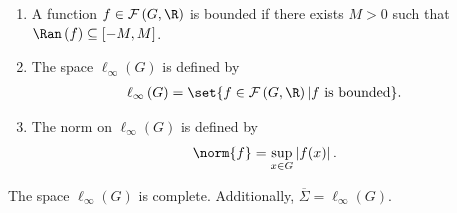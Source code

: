 \begin{definition}\hfill
  \begin{enumerate}[(1)]
    \item A function $f\in \mathcal{F}\left(G,\R\right)$ is bounded if there exists $M > 0$ such that $\Ran\left(f\right) \subseteq \left[-M,M\right]$.
    \item The space $\ell_{\infty}\left(G\right)$ is defined by
      \begin{align*}
        \ell_{\infty}\left(G\right) &= \set{f\in \mathcal{F}\left(G,\R\right)| f\text{ is bounded}}.
      \end{align*}
    \item The norm on $\ell_{\infty}\left(G\right)$ is defined by
      \begin{align*}
        \norm{f} &= \sup_{x\in G}\left\vert f(x) \right\vert.
      \end{align*}
  \end{enumerate}
\end{definition}
\begin{proposition}
  The space $\ell_{\infty}(G)$ is complete. Additionally, $\overline{\Sigma} = \ell_{\infty}\left(G\right)$.
\end{proposition}

